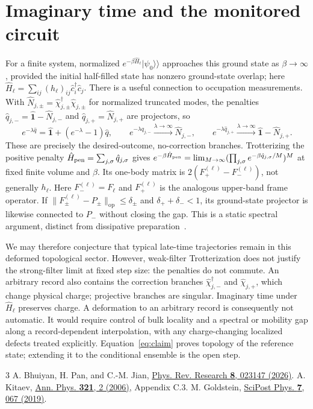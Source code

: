 \documentclass[aps,prb,onecolumn,nofootinbib,superscriptaddress]{revtex4-2}
\newcommand{\op}{\mathrm{op}}
\newcommand{\kett}[1]{\lvert#1\rangle\!\rangle}
\begin{document}
\section{Imaginary time and the monitored circuit}
For a finite system, normalized $e^{-\beta\hat H_\ell}\kett{\psi_0}$ approaches
this ground state as $\beta\to\infty$, provided the initial half-filled state
has nonzero ground-state overlap; here
$\hat H_\ell=\sum_{ij}(h_\ell)_{ij}\hat c_i^\dagger\hat c_j$.
There is a useful connection to occupation measurements. With
$\hat N_{j,\pm}=\hat\chi_{j,\pm}^\dagger\hat\chi_{j,\pm}$ for normalized truncated modes,
the penalties $\hat q_{j,-}=\hat{\mathbf{1}}-\hat N_{j,-}$ and
$\hat q_{j,+}=\hat N_{j,+}$ are projectors, so
\begin{equation}
 e^{-\lambda\hat q}=\hat{\mathbf{1}}+(e^{-\lambda}-1)\hat q,
 \qquad e^{-\lambda\hat q_{j,-}}\xrightarrow{\lambda\to\infty}\hat N_{j,-},
 \qquad e^{-\lambda\hat q_{j,+}}\xrightarrow{\lambda\to\infty}
 \hat{\mathbf{1}}-\hat N_{j,+}. \label{eq:filter}
\end{equation}
These are precisely the desired-outcome, no-correction branches. Trotterizing
the positive penalty $\hat H_{\rm pen}=\sum_{j,\sigma}\hat q_{j,\sigma}$
gives $e^{-\beta\hat H_{\rm pen}}=\lim_{M\to\infty}
(\prod_{j,\sigma}e^{-\beta\hat q_{j,\sigma}/M})^M$ at fixed finite volume
and $\beta$. Its one-body matrix is
$2(F_+^{(\ell)}-F_-^{(\ell)})$, not generally $h_\ell$.
Here $F_-^{(\ell)}=F_\ell$ and $F_+^{(\ell)}$ is the analogous upper-band frame
operator. If $\|F_\pm^{(\ell)}-P_\pm\|_\op\le\delta_\pm$ and
$\delta_++\delta_-<1$, its ground-state projector is likewise connected to
$P_-$ without closing the gap. This is a static spectral argument, distinct
from dissipative preparation~\cite{Goldstein}.

We may therefore conjecture that typical late-time trajectories remain in
this deformed topological sector. However, weak-filter Trotterization does
not justify the strong-filter limit at fixed step size: the penalties do
not commute. An arbitrary record also contains the correction branches
$\hat\chi_{j,-}^\dagger$ and $\hat\chi_{j,+}$, which change physical charge;
projective branches are singular. Imaginary time under $\hat H_\ell$ preserves
charge. A deformation to an arbitrary record is consequently not automatic.
It would require control of bulk locality and a spectral or mobility gap
along a record-dependent interpolation, with any charge-changing localized
defects treated explicitly. Equation~\eqref{eq:claim} proves topology of the
reference state; extending it to the conditional ensemble is the open step.

\begin{thebibliography}{3}
 A. Bhuiyan, H. Pan, and C.-M. Jian,
\href{https://doi.org/10.1103/nk38-ygyq}{Phys. Rev. Research \textbf{8}, 023147 (2026)}.
 A. Kitaev,
\href{https://doi.org/10.1016/j.aop.2005.10.005}{Ann. Phys. \textbf{321}, 2 (2006)}, Appendix C.3.
 M. Goldstein,
\href{https://doi.org/10.21468/SciPostPhys.7.5.067}{SciPost Phys. \textbf{7}, 067 (2019)}.
\end{thebibliography}
\end{document}
